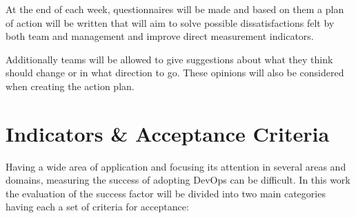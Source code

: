 	At the end of each week, questionnaires will be made and based on them a plan of action will be written that will aim to solve possible dissatisfactions felt by both team and management and improve direct measurement indicators. 

	Additionally teams will be allowed to give suggestions about what they think should change or in what direction to go. These opinions will also be considered when creating the action plan. 

\section{Indicators \& Acceptance Criteria}

	Having a wide area of application and focusing its attention in several areas and domains, measuring the success of adopting DevOps can be difficult. In this work the evaluation of the success factor will be divided into two main categories having each a set of criteria for acceptance:



